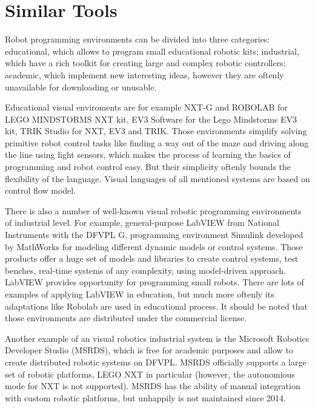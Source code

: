 \documentclass[conference,compsoc]{IEEEtran}
\begin{document}
\section{Similar Tools}
\label{sec:Overview}
Robot programming environments can be divided into three categories: educational, which allows to program small educational robotic kits; industrial, which have a rich toolkit for creating large and complex robotic controllers; academic, which implement new interesting ideas, however they are oftenly unavailable for downloading or unusable.

Educational visual enviroments are for example NXT-G and ROBOLAB for LEGO MINDSTORMS NXT kit, EV3 Software for the Lego Mindstorms EV3 kit, TRIK Studio for NXT, EV3 and TRIK. Those environments simplify solving primitive robot control tasks like finding a way out of the maze and driving along the line using light sensors, which makes the process of learning the basics of programming and robot control easy. But their simplicity oftenly bounds the flexibility of the language. Visual languages of all mentioned systems are based on control flow model.

There is also a number of well-known visual robotic programming environments of industrial level. For example, general-purpose LabVIEW from National Instruments with the DFVPL G, programming environment Simulink developed by MathWorks for modeling different dynamic models or control systems. Those products offer a huge set of models and libraries to create control systems, test benches, real-time systems of any complexity, using model-driven approach. LabVIEW provides opportunity for programming small robots. There are lots of examples of applying LabVIEW in education\cite{erwin2000lego, 1_gomez-de-gabriel_mandow_fernandez-lozano_garcia-cerezo_2011}, but much more oftenly its adaptations like Robolab are used in educational process. It should be noted that those environments are distributed under the commercial license.

Another example of an visual robotics industrial system is the Microsoft Robotics Developer Studio (MSRDS)\cite{jackson2007microsoft}, which is free for academic purposes and allow to create distributed robotic systems on DFVPL. MSRDS officially supports a large set of robotic platforms, LEGO NXT\cite{kim2007programming} in particular (however, the autonomious mode for NXT is not supported). MSRDS has the ability of manual integration with custom robotic platforms, but unhappily is not maintained since 2014.
\end{document}
